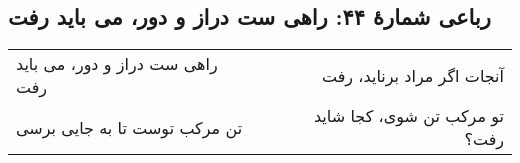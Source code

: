 \begin{center}
\section*{رباعی شمارهٔ ۴۴: راهی ست دراز و دور، می باید رفت}
\label{sec:044}
\begin{longtable}{l p{0.5cm} r}
راهی ست دراز و دور، می باید رفت
&&
آنجات اگر مراد برناید، رفت
\\
تن مرکب توست تا به جایی برسی
&&
تو مرکب تن شوی، کجا شاید رفت؟
\\
\end{longtable}
\end{center}
